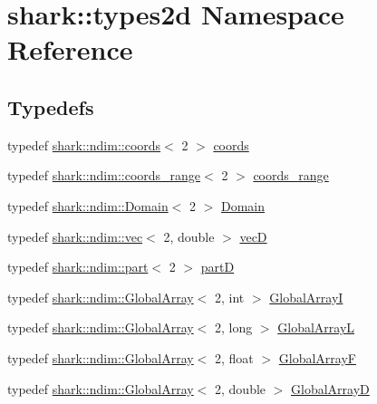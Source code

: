 \hypertarget{namespaceshark_1_1types2d}{}\section{shark\+:\+:types2d Namespace Reference}
\label{namespaceshark_1_1types2d}
\subsection*{Typedefs}
\begin{DoxyCompactItemize}
\item 
typedef \hyperlink{structshark_1_1ndim_1_1coords}{shark\+::ndim\+::coords}$<$ 2 $>$ \hyperlink{namespaceshark_1_1types2d_a1a1f893cb5a62e4302ace27c916fab85}{coords}
\item 
typedef \hyperlink{structshark_1_1ndim_1_1coords__range}{shark\+::ndim\+::coords\+\_\+range}$<$ 2 $>$ \hyperlink{namespaceshark_1_1types2d_ad6b127b4b9b81fb69d24cb8bbf75bd22}{coords\+\_\+range}
\item 
typedef \hyperlink{classshark_1_1ndim_1_1_domain}{shark\+::ndim\+::\+Domain}$<$ 2 $>$ \hyperlink{namespaceshark_1_1types2d_add258bcfe2771656d368ea0823c24da2}{Domain}
\item 
typedef \hyperlink{structshark_1_1ndim_1_1vec}{shark\+::ndim\+::vec}$<$ 2, double $>$ \hyperlink{namespaceshark_1_1types2d_a738ed8ca791a1fce6898c99ca68afc45}{vecD}
\item 
typedef \hyperlink{structshark_1_1ndim_1_1part}{shark\+::ndim\+::part}$<$ 2 $>$ \hyperlink{namespaceshark_1_1types2d_a87ef5d69759f5e1abf90fa90d89ff15c}{partD}
\item 
typedef \hyperlink{classshark_1_1ndim_1_1_global_array}{shark\+::ndim\+::\+Global\+Array}$<$ 2, int $>$ \hyperlink{namespaceshark_1_1types2d_a39a9fe43083ea314e6888261999a5150}{Global\+ArrayI}
\item 
typedef \hyperlink{classshark_1_1ndim_1_1_global_array}{shark\+::ndim\+::\+Global\+Array}$<$ 2, long $>$ \hyperlink{namespaceshark_1_1types2d_ab6446fd191a5f7a1c40c0ef58211aee9}{Global\+ArrayL}
\item 
typedef \hyperlink{classshark_1_1ndim_1_1_global_array}{shark\+::ndim\+::\+Global\+Array}$<$ 2, float $>$ \hyperlink{namespaceshark_1_1types2d_ab94e32185533536da64b098df3482eab}{Global\+ArrayF}
\item 
typedef \hyperlink{classshark_1_1ndim_1_1_global_array}{shark\+::ndim\+::\+Global\+Array}$<$ 2, double $>$ \hyperlink{namespaceshark_1_1types2d_a27c5f04d618bfd24d390ffe505258613}{Global\+ArrayD}

\end{DoxyCompactItemize}
